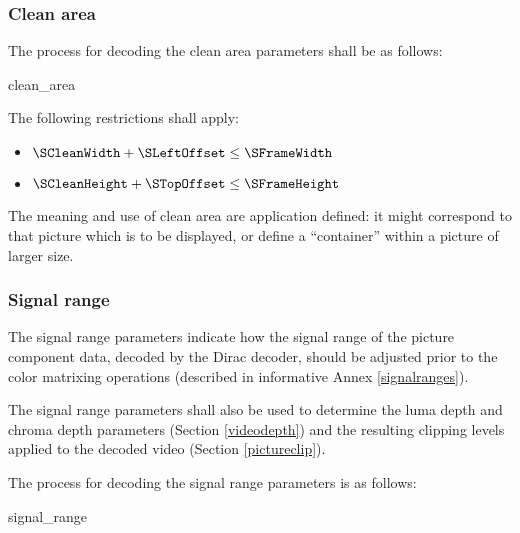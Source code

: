 \subsubsection{Clean area}
\label{cleanarea}

The process for decoding the clean area parameters shall be as follows:

\begin{pseudo}{clean\_area}{\VideoParams}
\bsEND
\end{pseudo}

The following restrictions shall apply:

\begin{itemize}
\item $\SCleanWidth+\SLeftOffset
\leq \SFrameWidth$
\item $\SCleanHeight+\STopOffset
\leq \SFrameHeight$
\end{itemize}

\begin{informative}
The meaning and use of clean area are application defined: it might correspond
to that picture which is to be displayed, or define a ``container'' within
a picture of larger size.
\end{informative}

\subsubsection{Signal range}
\label{signalrange}

The signal range parameters indicate how the signal range of the picture 
component data, decoded by the Dirac decoder, should be adjusted prior to 
the color matrixing operations (described in informative Annex \ref{signalranges}). 

The signal range parameters shall also be used to determine the luma depth 
and chroma depth parameters (Section \ref{videodepth}) and the resulting 
clipping levels applied to the decoded video (Section \ref{pictureclip}).

The process for decoding the signal range parameters is as follows:

\begin{pseudo}{signal\_range}{\VideoParams}
    \bsELSE
    \bsEND
\bsEND
\end{pseudo}

